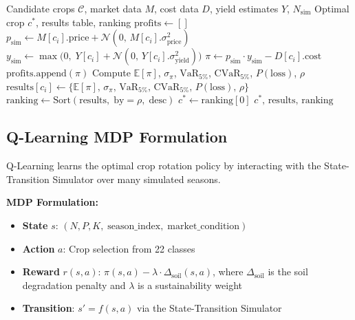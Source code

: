 \documentclass[conference]{IEEEtran}
\begin{document}
\begin{algorithm}[htbp]
\caption{Monte Carlo Economic Risk Optimiser}
\label{alg:montecarlo}
\begin{algorithmic}[1]
\Require Candidate crops $\mathcal{C}$, market data $M$, cost data $D$,
         yield estimates $Y$, $N_{\mathrm{sim}}$
\Ensure Optimal crop $c^*$, results table, ranking
  \State $\mathrm{profits} \gets []$
    \State $p_{\mathrm{sim}} \gets M[c_i].\mathrm{price} +
           \mathcal{N}(0,\, M[c_i].\sigma_{\mathrm{price}}^2)$
    \State $y_{\mathrm{sim}} \gets \max\!\bigl(0,\;
           Y[c_i] + \mathcal{N}(0,\, Y[c_i].\sigma_{\mathrm{yield}}^2)\bigr)$
    \State $\pi \gets p_{\mathrm{sim}} \cdot y_{\mathrm{sim}} - D[c_i].\mathrm{cost}$
    \State $\mathrm{profits}.\mathrm{append}(\pi)$
  \EndFor
  \State Compute $\mathbb{E}[\pi]$, $\sigma_\pi$, $\mathrm{VaR}_{5\%}$,
         $\mathrm{CVaR}_{5\%}$, $P(\mathrm{loss})$, $\rho$
  \State $\mathrm{results}[c_i] \gets \{\mathbb{E}[\pi],\, \sigma_\pi,\,
         \mathrm{VaR}_{5\%},\, \mathrm{CVaR}_{5\%},\, P(\mathrm{loss}),\, \rho\}$
\EndFor
\State $\mathrm{ranking} \gets \mathrm{Sort}(\mathrm{results},\;
       \mathrm{by}=\rho,\; \mathrm{desc})$
\State $c^* \gets \mathrm{ranking}[0]$
\State \Return $c^*,\, \mathrm{results},\, \mathrm{ranking}$
\end{algorithmic}
\end{algorithm}

\subsection{Q-Learning MDP Formulation}

Q-Learning learns the optimal crop rotation policy by interacting with
the State-Transition Simulator over many simulated seasons.

\textbf{MDP Formulation:}
\begin{itemize}
  \item \textbf{State} $s$: $(N, P, K,\; \mathrm{season\_index},\;
        \mathrm{market\_condition})$
  \item \textbf{Action} $a$: Crop selection from 22 classes
  \item \textbf{Reward} $r(s, a)$: $\pi(s, a) - \lambda \cdot
        \Delta_{\mathrm{soil}}(s, a)$, where $\Delta_{\mathrm{soil}}$ is
        the soil degradation penalty and $\lambda$ is a sustainability weight
  \item \textbf{Transition}: $s' = f(s, a)$ via the State-Transition Simulator
\end{itemize}
\end{document}
